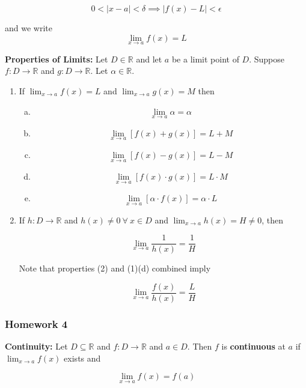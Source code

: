 \documentclass{article}
\begin{document}
\[
0 < |x - a| < \delta \implies |f(x) - L| < \epsilon
\]

and we write \[\lim_{x \to a} f(x) = L\]

\textbf{Properties of Limits:} Let \(D \in \mathbb{R}\) and let \(a\) be a limit point of \(D\). Suppose \(f:D \to \mathbb{R}\) and \(g: D \to \mathbb{R}\). Let \(\alpha \in \mathbb{R}\).

\begin{enumerate}[(1)]

\item If \(\lim_{x \to a} f(x) = L\) and \(\lim_{x \to a} g(x) = M\) then

\begin{enumerate}[(a)]

\item \[\lim_{x \to a} \alpha = \alpha\]

\item \[\lim_{x \to a} [f(x) + g(x)] = L + M\]

\item \[\lim_{x \to a} [f(x) - g(x)] = L - M\]

\item \[\lim_{x \to a} [f(x) \cdot g(x)] = L \cdot M\]

\item \[\lim_{x \to a} [\alpha \cdot f(x)] = \alpha \cdot L\]

\end{enumerate}

\item If \(h:D \to \mathbb{R}\) and \(h(x) \neq 0 \ \forall \ x \in D\) and \(\lim_{x \to a} h(x) = H \neq 0\), then

\[
\lim_{x \to a} \frac{1}{h(x)} = \frac{1}{H}
\]

Note that properties (2) and (1)(d) combined imply

\[
\lim_{x \to a} \frac{f(x)}{h(x)} = \frac{L}{H}
\]

\end{enumerate}

\subsubsection{Homework 4}

\textbf{Continuity:} Let \(D \subseteq \mathbb{R}\) and \(f:D \to \mathbb{R}\) and \(a \in D\). Then \(f\) is \textbf{continuous} at \(a\) if \(\lim_{x \to a} f(x)\) exists and 

\[
\lim_{x \to a} f(x) = f(a)
\]
\end{document}

